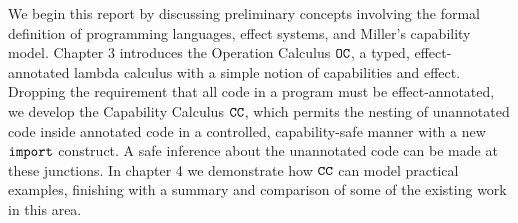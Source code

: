 We begin this report by discussing preliminary concepts involving the formal definition of programming languages, effect systems, and Miller's capability model. Chapter 3 introduces the Operation Calculus $\mathtt{OC}$, a typed, effect-annotated lambda calculus with a simple notion of capabilities and effect. Dropping the requirement that all code in a program must be effect-annotated, we develop the Capability Calculus $\mathtt{CC}$, which permits the nesting of unannotated code inside annotated code in a controlled, capability-safe manner with a new $\mathtt{import}$ construct. A safe inference about the unannotated code can be made at these junctions. In chapter 4 we demonstrate how $\mathtt{CC}$ can model practical examples, finishing with a summary and comparison of some of the existing work in this area.